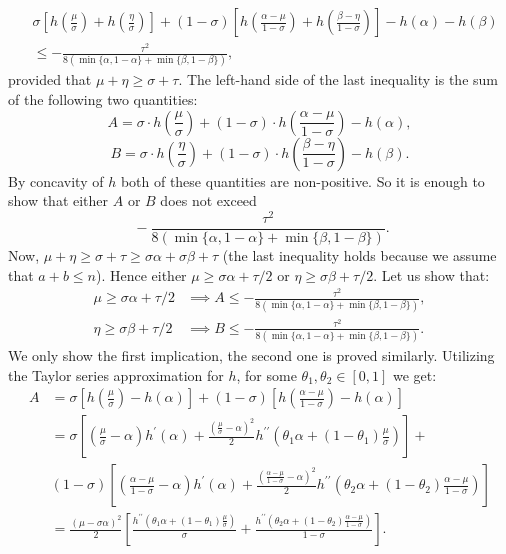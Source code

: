 \documentclass[12pt]{article}
\let\leq\leqslant
\let\geq\geqslant
\let\le\leq
\let\ge\geq
\begin{document}
\begin{align*} &\sigma\left[h\left(\frac{\mu}{\sigma}\right) + h\left(\frac{\eta}{\sigma}\right)\right] + (1 - \sigma) \left[h\left(\frac{\alpha - \mu}{1 - \sigma}\right) + h\left(\frac{\beta - \eta}{1 - \sigma}\right)\right]  - h(\alpha) - h(\beta)
\\ &\le -\frac{\tau^2}{8(\min\{\alpha, 1 - \alpha\} + \min\{\beta, 1 - \beta\})},
\end{align*}
provided that $\mu + \eta \ge \sigma + \tau$.
The left-hand side of the last inequality is the sum of the following two quantities:
$$A = \sigma\cdot h\left(\frac{\mu}{\sigma}\right) + (1 - \sigma)\cdot h\left(\frac{\alpha - \mu}{1 - \sigma}\right) - h(\alpha),$$
$$B = \sigma\cdot h\left(\frac{\eta}{\sigma}\right) + (1 - \sigma)\cdot h\left(\frac{\beta - \eta}{1 - \sigma}\right) - h(\beta).$$
By concavity of $h$ both of these quantities are non-positive. So it is enough to show that either $A$ or $B$ does not exceed
$$\ -\frac{\tau^2}{8(\min\{\alpha, 1 - \alpha\} + \min\{\beta, 1 - \beta\})}.$$
Now, $\mu + \eta \ge \sigma + \tau \ge \sigma \alpha + \sigma \beta + \tau$ (the last inequality holds because we assume that $a + b\le n$). Hence either $\mu \ge \sigma\alpha + \tau/2$ or $\eta \ge \sigma\beta + \tau/2$. Let us show that:
\begin{align*}
\mu \ge \sigma\alpha + \tau/2 &\implies A \le  -\frac{\tau^2}{8(\min\{\alpha, 1 - \alpha\} + \min\{\beta, 1 - \beta\})}, \\
\eta \ge \sigma\beta + \tau/2 &\implies B\le  -\frac{\tau^2}{8(\min\{\alpha, 1 - \alpha\} + \min\{\beta, 1 - \beta\})}.
\end{align*}
We only show the first implication, 
the second one is proved similarly. 
Utilizing the Taylor series approximation for $h$, for some $\theta_1, \theta_2 \in [0, 1]$ we get:
\begin{align*}
A &= \sigma\left[h\left(\frac{\mu}{\sigma}\right) - h(\alpha) \right] + (1 - \sigma)\left[h\left(\frac{\alpha - \mu}{1 - \sigma}\right) - h(\alpha)\right] \\
&=\sigma\left[\left(\frac{\mu}{\sigma} - \alpha\right) h^\prime(\alpha) + \frac{\left(\frac{\mu}{\sigma} - \alpha\right)^2}{2} h^{\prime\prime}\left(\theta_1\alpha + (1 - \theta_1)\frac{\mu}{\sigma}\right) \right] + \\
&(1 -\sigma)\left[\left(\frac{\alpha - \mu}{1 - \sigma} - \alpha\right) h^\prime(\alpha) + \frac{\left(\frac{\alpha - \mu}{1 - \sigma} - \alpha\right)^2}{2} h^{\prime\prime}\left(\theta_2\alpha + (1 - \theta_2)\frac{\alpha - \mu}{1 - \sigma}\right) \right] \\
&= \frac{(\mu - \sigma\alpha)^2}{2}\left[\frac{h^{\prime\prime}\left(\theta_1\alpha + (1 - \theta_1)\frac{\mu}{\sigma}\right)}{\sigma} +\frac{ h^{\prime\prime}\left(\theta_2\alpha + (1 - \theta_2)\frac{\alpha - \mu}{1 - \sigma}\right)}{1 - \sigma}\right].
\end{align*}
\end{document}
